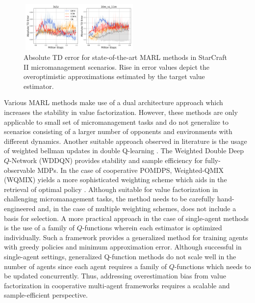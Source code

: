 \documentclass{article}
\begin{document}
\begin{multicols}{2}
\begin{figure}
    \centering
    \includegraphics[height=2.5cm,width=6cm]{tderror.png}
    \caption{Absolute TD error for state-of-the-art MARL methods in StarCraft II micromanagement scenarios. Rise in error values depict the overoptimistic approximations estimated by the target value estimator.}
    \label{fig:tderror}
\end{figure}


Various MARL methods \cite{twinmix} make use of a dual architecture approach which increases the stability in value factorization. However, these methods are only applicable to small set of micromanagement tasks and do not generalize to scenarios consisting of a larger number of opponents and environments with different dynamics. Another suitable approach observed in literature is the usage of weighted bellman updates in double Q-learning \cite{weightdouble}. The Weighted Double Deep $Q$-Network (WDDQN) provides stability and sample efficiency for fully-observable MDPs. In the case of cooperative POMDPS, Weighted-QMIX (WQMIX) \cite{wqmix} yields a more sophisticated weighting scheme which aids in the retrieval of optimal policy \cite{challenges}. Although suitable for value factorization in challenging micromanagement tasks, the method needs to be carefully hand-engineered and, in the case of multiple weighting schemes, does not include a basis for selection. A more practical approach in the case of single-agent methods is the use of a family of $Q$-functions \cite{maxmin} wherein each estimator is optimized individually. Such a framework provides a generalized method for training agents with greedy policies and minimum approximation error. Although successful in single-agent settings, generalized Q-function methods do not scale well in the number of agents \cite{challenges} since each agent requires a family of $Q$-functions which needs to be updated concurrently. Thus, addressing overestimation bias from value factorization in cooperative multi-agent frameworks requires a scalable and sample-efficient perspective.  


\end{multicols}
\end{document}
